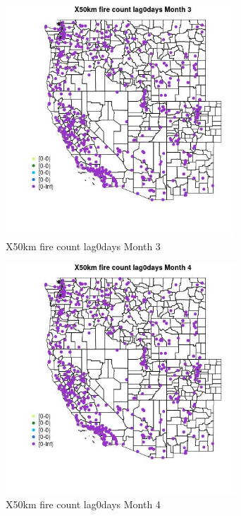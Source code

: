 \begin{figure} 
\centering  
\includegraphics[width=0.77\textwidth]{Code_Outputs/Report_ML_input_PM25_Step4_part_e_de_duplicated_aves_compiled_2019-05-14wNAs_MapObsMo3X50km_fire_count_lag0days.jpg} 
\caption{\label{fig:Report_ML_input_PM25_Step4_part_e_de_duplicated_aves_compiled_2019-05-14wNAsMapObsMo3X50km_fire_count_lag0days}X50km fire count lag0days Month 3} 
\end{figure} 
 

\clearpage 

\begin{figure} 
\centering  
\includegraphics[width=0.77\textwidth]{Code_Outputs/Report_ML_input_PM25_Step4_part_e_de_duplicated_aves_compiled_2019-05-14wNAs_MapObsMo4X50km_fire_count_lag0days.jpg} 
\caption{\label{fig:Report_ML_input_PM25_Step4_part_e_de_duplicated_aves_compiled_2019-05-14wNAsMapObsMo4X50km_fire_count_lag0days}X50km fire count lag0days Month 4} 
\end{figure} 
 

